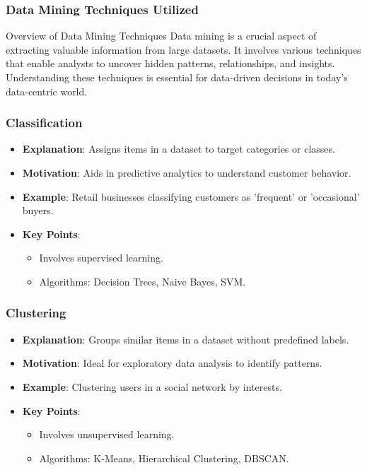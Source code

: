 \documentclass[aspectratio=169]{beamer}
\begin{document}
\begin{frame}[fragile]
    \frametitle{Data Mining Techniques Utilized}
    \begin{block}{Overview of Data Mining Techniques}
        Data mining is a crucial aspect of extracting valuable information from large datasets. 
        It involves various techniques that enable analysts to uncover hidden patterns, 
        relationships, and insights. Understanding these techniques is essential for data-driven decisions 
        in today’s data-centric world.
    \end{block}
\end{frame}

\begin{frame}[fragile]
    \frametitle{Classification}
    \begin{itemize}
        \item \textbf{Explanation}: Assigns items in a dataset to target categories or classes.
        \item \textbf{Motivation}: Aids in predictive analytics to understand customer behavior.
        \item \textbf{Example}: Retail businesses classifying customers as 'frequent' or 'occasional' buyers.
        \item \textbf{Key Points}:
        \begin{itemize}
            \item Involves supervised learning.
            \item Algorithms: Decision Trees, Naive Bayes, SVM.
        \end{itemize}
    \end{itemize}
\end{frame}

\begin{frame}[fragile]
    \frametitle{Clustering}
    \begin{itemize}
        \item \textbf{Explanation}: Groups similar items in a dataset without predefined labels.
        \item \textbf{Motivation}: Ideal for exploratory data analysis to identify patterns.
        \item \textbf{Example}: Clustering users in a social network by interests.
        \item \textbf{Key Points}:
        \begin{itemize}
            \item Involves unsupervised learning.
            \item Algorithms: K-Means, Hierarchical Clustering, DBSCAN.
        \end{itemize}
    \end{itemize}
\end{frame}
\end{document}
